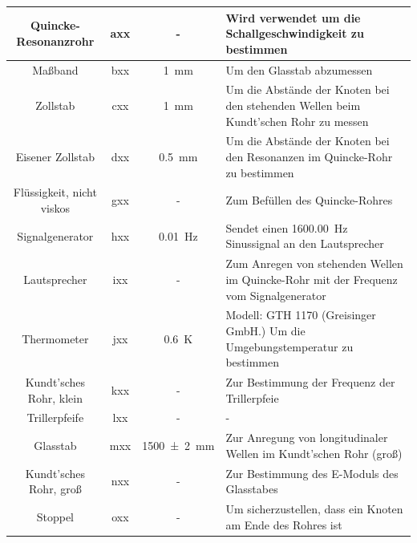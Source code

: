 \documentclass[11pt]{scrartcl}
\begin{document}
\begin{longtable}{c|c|S|p{19em}}
        Quincke-Resonanzrohr               & axx       & { - }             & Wird verwendet um die Schallgeschwindigkeit zu bestimmen                              \\ \hline
        Maßband                            & bxx       & \SI{1}{\mm}       & Um den Glasstab abzumessen                                                            \\ \hline
        Zollstab                           & cxx       & \SI{1}{\mm}       & Um die Abstände der Knoten bei den stehenden Wellen beim Kundt'schen Rohr zu messen   \\ \hline
        Eisener Zollstab                   & dxx       & \SI{0.5}{\mm}     & Um die Abstände der Knoten bei den Resonanzen im Quincke-Rohr zu bestimmen            \\ \hline
        Flüssigkeit, nicht viskos          & gxx       & { - }             & Zum Befüllen des Quincke-Rohres                                                       \\ \hline
        Signalgenerator                    & hxx       & \SI{0.01}{\hertz} & Sendet einen \SI{1600.00}{\hertz} Sinussignal an den Lautsprecher                     \\ \hline
        Lautsprecher                       & ixx       & { - }             & Zum Anregen von stehenden Wellen im Quincke-Rohr mit der Frequenz vom Signalgenerator \\ \hline
        Thermometer                        & jxx       & \SI{0.6}{\kelvin} & Modell: GTH 1170 (Greisinger GmbH.) Um die Umgebungstemperatur zu bestimmen           \\ \hline
        Kundt'sches Rohr, klein            & kxx       & { - }             & Zur Bestimmung der Frequenz der Trillerpfeie                                          \\ \hline
        Trillerpfeife                      & lxx       & { - }             & -                                                                                     \\ \hline
        Glasstab                           & mxx       & \SI{1500(2)}{\mm} & Zur Anregung von longitudinaler Wellen im Kundt'schen Rohr (groß)                     \\ \hline
        Kundt'sches Rohr, groß             & nxx       & { - }             & Zur Bestimmung des E-Moduls des Glasstabes                                            \\ \hline
        Stoppel                            & oxx       & { - }             & Um sicherzustellen, dass ein Knoten am Ende des Rohres ist                            \\ \hline

\end{longtable}
\end{document}
